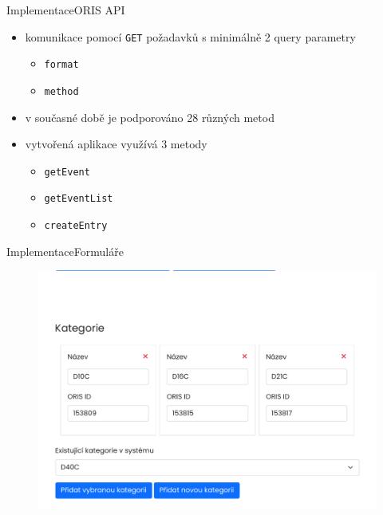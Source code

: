 \documentclass[aspectratio=169]{beamer}
\begin{document}
\begin{frame}{Implementace}{ORIS API}
    \begin{itemize}
        \item komunikace pomocí \texttt{GET} požadavků s minimálně 2 query parametry
        \begin{itemize}
            \item \texttt{format}
            \item \texttt{method}
        \end{itemize}
        \item v současné době je podporováno 28 různých metod
        \item vytvořená aplikace využívá 3 metody
        \begin{itemize}
            \item \texttt{getEvent}
            \item \texttt{getEventList}
            \item \texttt{createEntry}
        \end{itemize}
    \end{itemize}
\end{frame}

\begin{frame}{Implementace}{Formuláře}
    \begin{figure}
        \includegraphics[width=0.65\linewidth, cfbox=lightgray 0.5pt 10pt]{images/categories.pdf}
    \end{figure}
\end{frame}
\end{document}
